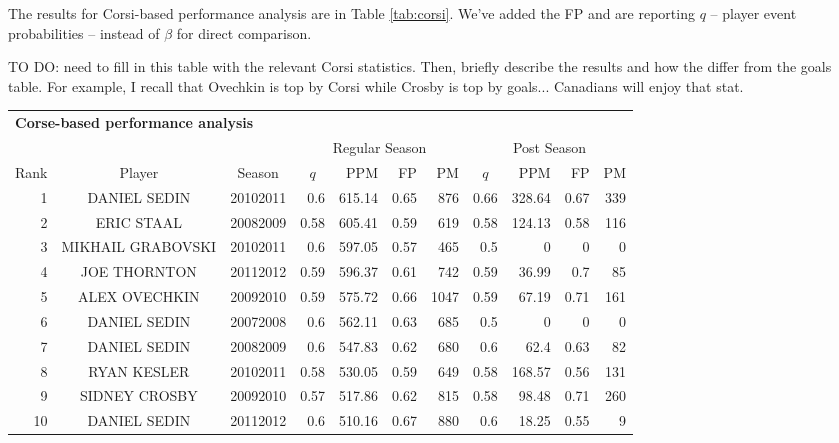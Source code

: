 The results for Corsi-based performance analysis are in Table \ref{tab:corsi}.
We've added the FP and are reporting $q$ -- player event probabilities --
instead of $\beta$ for direct comparison.

{\color{red} TO DO: need to fill in this table with the relevant Corsi statistics.  Then, briefly describe the results and how the differ from the goals table.  For example, I recall that Ovechkin is top by Corsi while Crosby is top by goals... Canadians will enjoy that stat.  }

\begin{table}[p]
        \centering\small
        \begin{tabular}{r c c r r r r r r r r }
        \multicolumn{11}{l}{\bf Corse-based performance analysis}\\
            & & & \multicolumn{4}{|c}{Regular Season} & \multicolumn{4}{|c}{Post Season}\\
            Rank & Player & Season  & \multicolumn{1}{|c}{$q$} & PPM & FP & PM & \multicolumn{1}{|c}{$q$} & PPM & FP & PM  \\ 
            \hline\rule{0pt}{4ex} 
            		1     & DANIEL SEDIN & 20102011 & 0.6   & 615.14 & 0.65  & 876   & 0.66  & 328.64 & 0.67  & 339 \\
            		2     & ERIC STAAL & 20082009 & 0.58  & 605.41 & 0.59  & 619   & 0.58  & 124.13 & 0.58  & 116 \\
            		3     & MIKHAIL GRABOVSKI & 20102011 & 0.6   & 597.05 & 0.57  & 465   & 0.5   & 0     & 0     & 0 \\
            		4     & JOE THORNTON & 20112012 & 0.59  & 596.37 & 0.61  & 742   & 0.59  & 36.99 & 0.7   & 85 \\
            		5     & ALEX OVECHKIN & 20092010 & 0.59  & 575.72 & 0.66  & 1047  & 0.59  & 67.19 & 0.71  & 161 \\
            		6     & DANIEL SEDIN & 20072008 & 0.6   & 562.11 & 0.63  & 685   & 0.5   & 0     & 0     & 0 \\
            		7     & DANIEL SEDIN & 20082009 & 0.6   & 547.83 & 0.62  & 680   & 0.6   & 62.4  & 0.63  & 82 \\
            		8     & RYAN KESLER & 20102011 & 0.58  & 530.05 & 0.59  & 649   & 0.58  & 168.57 & 0.56  & 131 \\
            		9     & SIDNEY CROSBY & 20092010 & 0.57  & 517.86 & 0.62  & 815   & 0.58  & 98.48 & 0.71  & 260 \\
            		10    & DANIEL SEDIN & 20112012 & 0.6   & 510.16 & 0.67  & 880   & 0.6   & 18.25 & 0.55  & 9 \\

\end{tabular}
\end{table}
